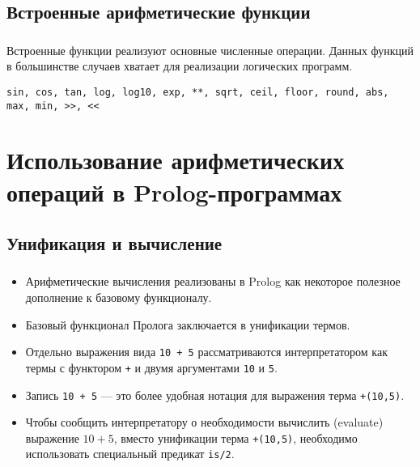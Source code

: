 \subsection{Встроенные арифметические функции}

\begin{frame}
	
	\frametitle{\insertsection}
	\framesubtitle{\insertsubsection}
	
	
	Встроенные функции реализуют основные численные операции. Данных функций в большинстве случаев хватает для реализации логических программ.
	
	\begin{rexample}
		\texttt{sin, cos, tan, log, log10, exp, **, sqrt, ceil, floor, round, abs, max, min, >>, <<}
	\end{rexample}
	
\end{frame}


\section{Использование арифметических операций в Prolog-программах}
\subsection{Унификация и вычисление}

\begin{frame}
	
	\frametitle{\insertsection}
	\framesubtitle{\insertsubsection}
	
	\begin{itemize}
		\item Арифметические вычисления реализованы в Prolog как некоторое полезное дополнение к базовому функционалу.
		\item Базовый функционал Пролога заключается в унификации термов.
		\item Отдельно выражения вида \texttt{10 + 5} рассматриваются интерпретатором как термы с функтором \texttt{+} и двумя аргументами \texttt{10} и \texttt{5}.
		\item Запись \texttt{10 + 5} --- это более удобная нотация для выражения терма \texttt{+(10,5)}.
		\item Чтобы сообщить интерпретатору о необходимости \alert{вычислить (evaluate)} выражение \( 10 + 5 \), вместо унификации терма \texttt{+(10,5)}, необходимо использовать
		специальный предикат \texttt{is/2}.
	\end{itemize}
	
\end{frame}


